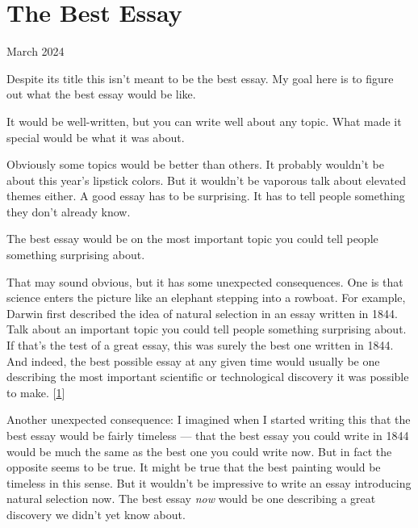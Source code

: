 \chapter{The Best Essay}


            
              
                

March 2024

Despite its title this isn't meant to
                  be the best essay. My goal here is to figure out what the best
                  essay would be like.

It would be well-written, but
                  you can write well about any topic. What made it special would
                  be what it was about.

Obviously some topics would
                  be better than others. It probably wouldn't be about this
                  year's lipstick colors. But it wouldn't be vaporous talk about
                  elevated themes either. A good essay has to be surprising. It
                  has to tell people something they don't already know.

The
                  best essay would be on the most important topic you could tell
                  people something surprising about.

That may sound
                  obvious, but it has some unexpected consequences. One is that
                  science enters the picture like an elephant stepping into a
                  rowboat. For example, Darwin first described the idea of
                  natural selection in an essay written in 1844. Talk about an
                  important topic you could tell people something surprising
                  about. If that's the test of a great essay, this was surely
                  the best one written in 1844. And indeed, the best possible
                  essay at any given time would usually be one describing the
                  most important scientific or technological discovery it was
                  possible to make.
                  [\href{\#f1n}{1}]

Another unexpected consequence: I imagined when I
                  started writing this that the best essay would be fairly
                  timeless --- that the best essay you could write in 1844
                  would be much the same as the best one you could write now.
                  But in fact the opposite seems to be true. It might be true
                  that the best painting would be timeless in this sense. But it
                  wouldn't be impressive to write an essay introducing natural
                  selection now. The best essay \emph{now} would be one
                  describing a great discovery we didn't yet know about.


